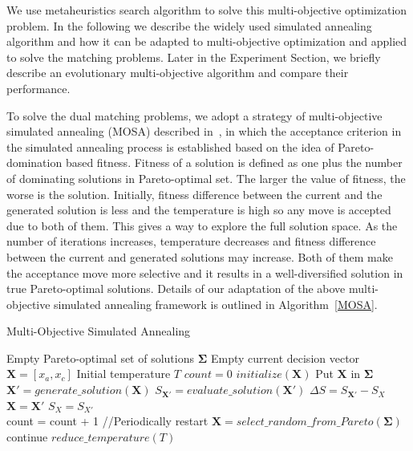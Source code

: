 We use metaheuristics search algorithm to solve this multi-objective optimization problem. In the following we describe the widely used simulated annealing algorithm and how it can be adapted to multi-objective optimization and applied to solve the matching problems. Later in the Experiment Section, we briefly describe an evolutionary multi-objective algorithm and compare their performance.

To solve the dual matching problems, we adopt a strategy of multi-objective simulated annealing (MOSA) described in~\cite{Suman2003}, in which the acceptance criterion in the simulated annealing process is established based on the idea of Pareto-domination based fitness. Fitness of a solution is defined as one plus the number of dominating solutions in Pareto-optimal set. The larger the value of fitness, the worse is the solution. Initially, fitness difference between the current and the generated solution is less and the temperature is high so any move is accepted due to both of them. This gives a way to explore the full solution space. As the number of iterations increases, temperature decreases and fitness difference between the current and generated solutions may increase. Both of them make the acceptance move more selective and it results in a well-diversified solution in true Pareto-optimal solutions. Details of our adaptation of the above multi-objective simulated annealing framework is outlined in Algorithm~\ref{MOSA}.


\begin{algorithm}
\caption{Multi-Objective Simulated Annealing}
\label{MOSA}
\begin{algorithmic}
\REQUIRE Empty Pareto-optimal set of solutions $\mathbf{\Sigma}$
\REQUIRE Empty current decision vector $\mathbf{X}=[x_a,x_c]$
\REQUIRE Initial temperature $T$
\STATE $count=0$
\STATE $initialize(\mathbf{X})$ \hspace{1in} %
\STATE Put $\mathbf{X}$ in $\mathbf{\Sigma}$
\STATE $\mathbf{X}'=generate\_solution(\mathbf{X})$
\STATE $S_{\mathbf{X}'}=evaluate\_solution(\mathbf{X}')$
\STATE $\Delta S = S_{\mathbf{X}'} - S_X$
\STATE $\mathbf{X}=\mathbf{X}'$
\STATE $S_X=S_{X'}$
\ENDIF\\
\STATE count = count + 1
\STATE //Periodically restart
\STATE $\mathbf{X}=select\_random\_from\_Pareto(\mathbf{\Sigma})$
\STATE continue
\ENDIF
\STATE $reduce\_temperature(T)$
\ENDWHILE
\end{algorithmic}
\end{algorithm}

